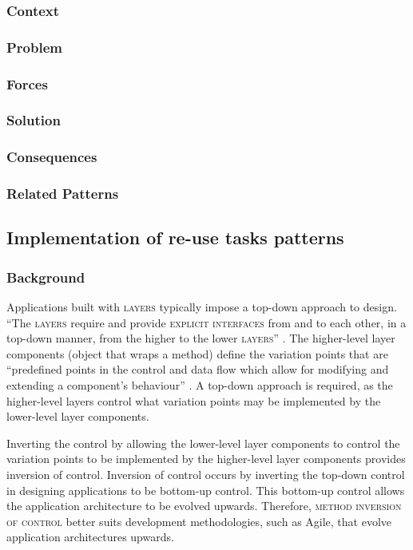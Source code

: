 \documentclass[prodmode]{style/acmlarge}
\begin{document}
\subsubsection*{Context}

\subsubsection*{Problem}

\subsubsection*{Forces}

\subsubsection*{Solution}

\subsubsection*{Consequences}

\subsubsection*{Related Patterns}



\subsection{Implementation of re-use tasks patterns}

\subsubsection*{Background}

Applications built with \textsc{layers} typically impose a top-down approach to
design.  ``The \textsc{layers} require and provide \textsc{explicit interfaces}
from and to each other, in a top-down manner, from the higher to the lower
\textsc{layers}'' \cite[p. 11]{ioc}.  The higher-level layer components (object
that wraps a method) define the variation points that are ``predefined points in
the control and data flow which allow for modifying and extending a component's
behaviour'' \cite[p. 5]{ioc}.  A top-down approach is required, as the
higher-level layers control what variation points may be implemented by the
lower-level layer components.

Inverting the control by allowing the lower-level layer components to control the
variation points to be implemented by the higher-level layer components provides
inversion of control.  Inversion of control occurs by inverting the top-down
control in designing applications to be bottom-up control.  This bottom-up
control allows the application architecture to be evolved upwards. Therefore,
\textsc{method inversion of control} better suits development methodologies, such as
Agile, that evolve application architectures upwards.
\end{document}
